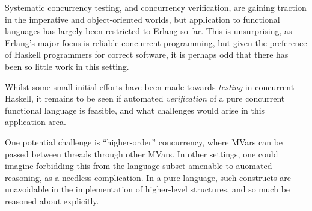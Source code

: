 Systematic concurrency testing, and concurrency verification, are
gaining traction in the imperative and object-oriented worlds, but
application to functional languages has largely been restricted to
Erlang so far. This is unsurprising, as Erlang's major focus is
reliable concurrent programming, but given the preference of Haskell
programmers for correct software, it is perhaps odd that there has
been so little work in this setting.

Whilst some small initial efforts have been made towards
\textit{testing} in concurrent Haskell, it remains to be seen if
automated \textit{verification} of a pure concurrent functional
language is feasible, and what challenges would arise in this
application area.

One potential challenge is ``higher-order'' concurrency, where MVars
can be passed between threads through other MVars. In other settings,
one could imagine forbidding this from the language subset amenable to
auomated reasoning, as a needless complication. In a pure language,
such constructs are unavoidable in the implementation of higher-level
structures, and so much be reasoned about explicitly.
